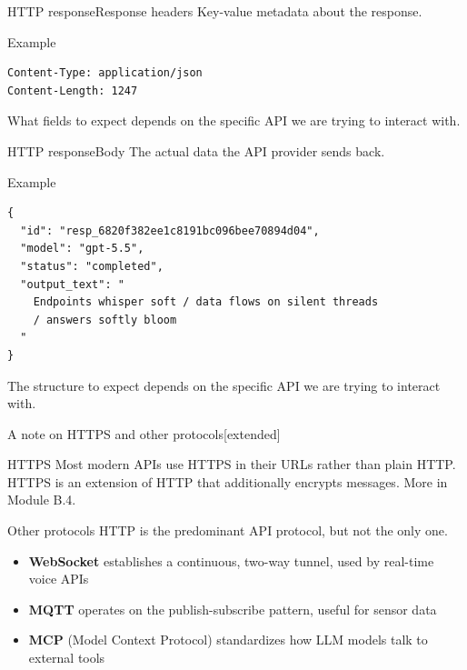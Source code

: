 \documentclass[aspectratio=169]{beamer}
\begin{document}
\begin{frame}[fragile]{HTTP response}{Response headers}
    Key-value metadata about the response.

    \begin{block}{Example}
        \begin{verbatim}
Content-Type: application/json
Content-Length: 1247
        \end{verbatim}
    \end{block}

    What fields to expect depends on the specific API we are trying to interact with.
\note{
}
\end{frame}


\begin{frame}[fragile]{HTTP response}{Body}
    The actual data the API provider sends back.

    \begin{block}{Example}
        \begin{verbatim}
{
  "id": "resp_6820f382ee1c8191bc096bee70894d04",
  "model": "gpt-5.5",
  "status": "completed",
  "output_text": "
    Endpoints whisper soft / data flows on silent threads
    / answers softly bloom
  "
}
        \end{verbatim}
    \end{block}

    The structure to expect depends on the specific API we are trying to interact with.
\note{
}
\end{frame}


\begin{frame}{A note on HTTPS and other protocols}[extended]
    \begin{block}{HTTPS}
        Most modern APIs use HTTPS in their URLs rather than plain HTTP.
        HTTPS is an extension of HTTP that additionally encrypts messages.
        More in Module B.4.
    \end{block}

    \begin{block}{Other protocols}
        HTTP is the predominant API protocol, but not the only one.
        \begin{itemize}
          \item \textbf{WebSocket} establishes a continuous, two-way tunnel, used by real-time voice APIs
          \item \textbf{MQTT} operates on the publish-subscribe pattern, useful for sensor data
          \item \textbf{MCP} (Model Context Protocol) standardizes how LLM models talk to external tools
        \end{itemize}
    \end{block}
\note{
}
\end{frame}
\end{document}
